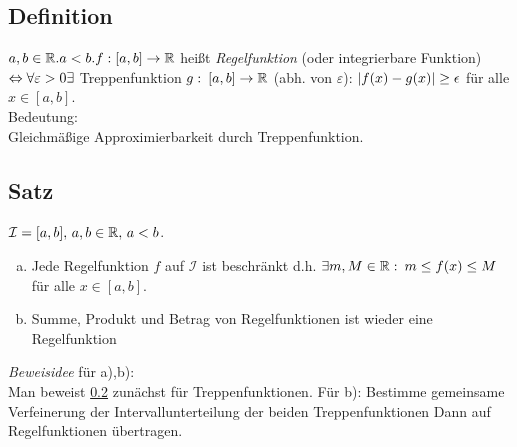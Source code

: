 \subsection{Definition}\label{sec:7.2}
$a,b \in \mathbb{R} . a < b.\\
f: [a,b] \to \mathbb{R}$ hei\ss t \emph{Regelfunktion} (oder integrierbare Funktion) $\Leftrightarrow\\
\forall \varepsilon > 0 \exists$ Treppenfunktion $g:\:[a,b] \to \mathbb{R}$ (abh. von $\varepsilon$): $\lvert f(x) - g(x) \rvert \ge \epsilon$ für alle $x \in [a,b]$.\\
Bedeutung:\\
Gleichmä\ss ige Approximierbarkeit durch Treppenfunktion.
\subsection[Satz: Regelfunktionen]{Satz}\label{sec:7.3}
$\mathcal{I} = [a,b],\, a,b \in \mathbb{R},\, a<b$.\\
\begin{enumerate}[a)]
\item Jede Regelfunktion $f$ auf $\mathcal{I}$ ist beschränkt d.h. $\exists m,M \in \mathbb{R} :\: m \leq f(x) \leq M$ für alle $x \in [a,b]$.\\
\item Summe, Produkt und Betrag von Regelfunktionen ist wieder eine Regelfunktion
\end{enumerate}
\emph{Beweisidee} für a),b):\\
Man beweist \ref{sec:7.3} zunächst für Treppenfunktionen. Für b): Bestimme gemeinsame Verfeinerung der Intervallunterteilung der beiden Treppenfunktionen
Dann auf Regelfunktionen übertragen.
